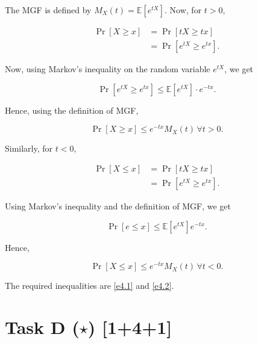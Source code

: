 
The MGF is defined by $M_X(t) = \mathbb{E}[e^{tX}]$. Now, for $t>0$,

\begin{equation*}
    \begin{aligned}
        \Pr[X\ge x] &= \Pr[tX\ge tx] \\
        &= \Pr[e^{tX}\ge e^{tx}].
    \end{aligned}
\end{equation*}

Now, using Markov's inequality on the random variable $e^{tX}$, we get

\begin{equation*}
    \Pr[e^{tX}\ge e^{tx}] \le \mathbb{E}[e^{tX}]\cdot e^{-tx}.
\end{equation*}

Hence, using the definition of MGF,

\begin{equation}
    \Pr[X\ge x] \le e^{-tx}M_X(t) \, \forall t>0.
    \label{e4.1}
\end{equation}

Similarly, for $t<0$,

\begin{equation*}
    \begin{aligned}
        \Pr[X\le x] &= \Pr[tX\ge tx] \\
        &= \Pr[e^{tX} \ge e^{tx}].
    \end{aligned}
\end{equation*}

Using Markov's inequality and the definition of MGF, we get

\begin{equation*}
        \Pr[e\le x] \le \mathbb{E}[e^{tX}]e^{-tx}.
\end{equation*}

Hence,

\begin{equation}
    \Pr[X\le x] \le e^{-tx}M_X(t) \, \forall t<0.
    \label{e4.2}
\end{equation}

The required inequalities are \ref{e4.1} and \ref{e4.2}.

\section*{\colS{$\S$} Task D ($\star$) \hfill \normalfont \large [1+4+1]}


